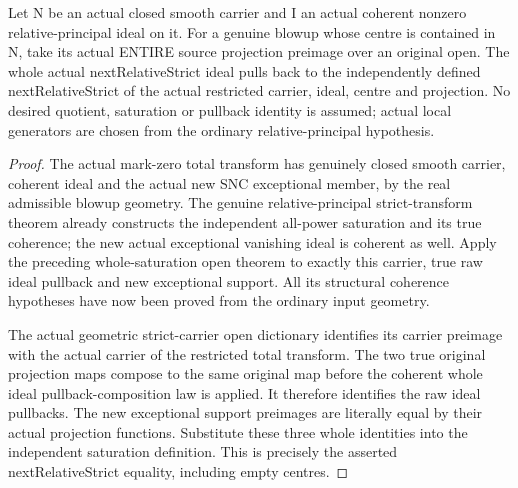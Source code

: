 \begin{theorem}
\label{hir:sharp-actual-next-relative-strict-open-naturality}
\leanok
Let N be an actual closed smooth carrier and I an actual coherent nonzero
relative-principal ideal on it. For a genuine blowup whose centre is contained
in N, take its actual ENTIRE source projection preimage over an original open.
The whole actual nextRelativeStrict ideal pulls back to the independently
defined nextRelativeStrict of the actual restricted carrier, ideal, centre
and projection. No desired quotient, saturation or pullback identity is assumed; actual
local generators are chosen from the ordinary relative-principal hypothesis.
\end{theorem}
\begin{proof}
The actual mark-zero total transform has genuinely closed smooth carrier,
coherent ideal and the actual new SNC exceptional member, by the real
admissible blowup geometry. The genuine relative-principal strict-transform
theorem already constructs the independent all-power saturation and its true
coherence; the new actual exceptional vanishing ideal is coherent as well.
Apply the preceding whole-saturation open theorem to exactly this carrier,
true raw ideal pullback and new exceptional support. All its structural
coherence hypotheses have now been proved from the ordinary input geometry.

The actual geometric strict-carrier open dictionary identifies its carrier
preimage with the actual carrier of the restricted total transform. The two
true original projection maps compose to the same original map before the
coherent whole ideal pullback-composition law is applied. It therefore
identifies the raw ideal pullbacks. The new exceptional support preimages
are literally equal by their actual projection functions. Substitute these
three whole identities into the independent saturation definition. This is
precisely the asserted nextRelativeStrict equality, including empty centres.
\end{proof}


